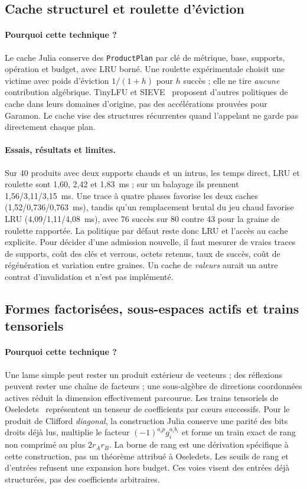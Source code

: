 \documentclass[11pt,a4paper]{article}
\newcommand{\code}[1]{\texttt{#1}}
\begin{document}
\subsection{Cache structurel et roulette d'éviction}
\paragraph{Pourquoi cette technique ?}
Le cache Julia conserve des \code{ProductPlan} par clé de métrique, base,
supports, opération et budget, avec LRU borné. Une roulette expérimentale
choisit une victime avec poids d'éviction $1/(1+h)$ pour $h$ succès ;
elle ne tire \emph{aucune} contribution algébrique. TinyLFU
\cite{tinylfu} et SIEVE~\cite{sieve} proposent d'autres politiques de cache
dans leurs domaines d'origine, pas des accélérations prouvées pour Garamon.
Le cache vise des structures récurrentes quand l'appelant ne garde pas
directement chaque plan.
\paragraph{Essais, résultats et limites.}
Sur 40 produits avec deux supports chauds et un intrus, les temps direct,
LRU et roulette sont 1,60, 2,42 et 1,83~ms ; sur un balayage ils prennent
1,56/3,11/3,15~ms. Une trace à quatre phases favorise les deux caches
(1,52/0,736/0,763~ms), tandis qu'un remplacement brutal du jeu chaud
favorise LRU (4,09/1,11/4,08~ms), avec 76 succès sur 80 contre 43
pour la graine de roulette rapportée. La politique par
défaut reste donc LRU et l'accès au cache explicite. Pour décider d'une
admission nouvelle, il faut mesurer de vraies traces de supports, coût des
clés et verrous, octets retenus, taux de succès, coût de régénération et
variation entre graines. Un cache de \emph{valeurs} aurait un autre contrat
d'invalidation et n'est pas implémenté.

\subsection{Formes factorisées, sous-espaces actifs et trains tensoriels}
\paragraph{Pourquoi cette technique ?}
Une lame simple peut rester un produit extérieur de vecteurs ; des réflexions
peuvent rester une chaîne de facteurs ; une sous-algèbre de directions
coordonnées actives réduit la dimension effectivement parcourue. Les trains
tensoriels de Oseledets~\cite{oseledets} représentent un tenseur de
coefficients par cœurs successifs. Pour le produit de Clifford \emph{diagonal},
la construction Julia conserve une parité des bits droits déjà lus, multiplie
le facteur $(-1)^{a_i p}g_i^{a_i b_i}$ et forme un train exact de rang
non comprimé au plus $2r_A r_B$. La borne de rang est une dérivation
spécifique à cette construction, pas un théorème attribué à
Oseledets. Les seuils de rang et d'entrées refusent une expansion hors budget.
Ces voies visent des entrées déjà structurées, pas des coefficients arbitraires.
\end{document}
